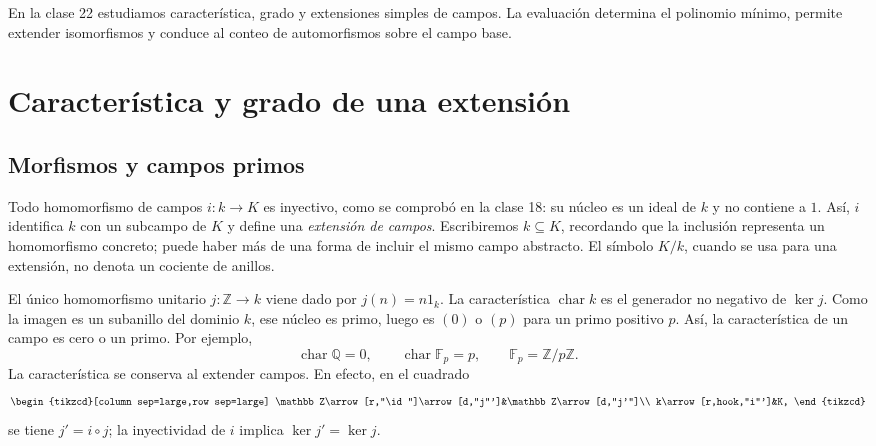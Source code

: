 En la clase 22 estudiamos característica, grado y extensiones simples de campos. La evaluación determina el polinomio mínimo, permite extender isomorfismos y conduce al conteo de automorfismos sobre el campo base.

\section{Característica y grado de una extensión}
\subsection{Morfismos y campos primos}
Todo homomorfismo de campos $i:k\to K$ es inyectivo, como se comprobó en la clase 18: su núcleo es un ideal de $k$ y no contiene a $1$. Así, $i$ identifica $k$ con un subcampo de $K$ y define una \emph{extensión de campos}. Escribiremos $k\subseteq K$, recordando que la inclusión representa un homomorfismo concreto; puede haber más de una forma de incluir el mismo campo abstracto. El símbolo $K/k$, cuando se usa para una extensión, no denota un cociente de anillos.

El único homomorfismo unitario $j:\mathbb Z\to k$ viene dado por $j(n)=n1_k$. La característica $\operatorname{char}k$ es el generador no negativo de $\ker j$. Como la imagen es un subanillo del dominio $k$, ese núcleo es primo, luego es $(0)$ o $(p)$ para un primo positivo $p$. Así, la característica de un campo es cero o un primo. Por ejemplo,
\[
\operatorname{char}\mathbb Q=0,\qquad
\operatorname{char}\mathbb F_p=p,\qquad
\mathbb F_p=\mathbb Z/p\mathbb Z.
\]
La característica se conserva al extender campos. En efecto, en el cuadrado
\[
\begin{tikzcd}[column sep=large,row sep=large]
\mathbb Z\arrow[r,"\id"]\arrow[d,"j"']&\mathbb Z\arrow[d,"j'"]\\
k\arrow[r,hook,"i"']&K,
\end{tikzcd}
\]
se tiene $j'=i\circ j$; la inyectividad de $i$ implica $\ker j'=\ker j$.

